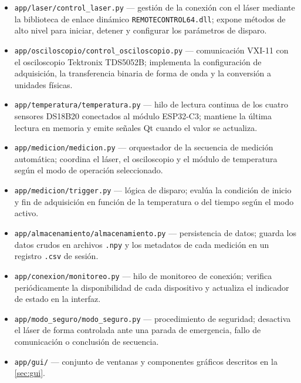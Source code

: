 \begin{itemize}
    \item \texttt{app/laser/control\_laser.py} — gestión de la conexión
    con el láser mediante la biblioteca de enlace dinámico
    \texttt{REMOTECONTROL64.dll}; expone métodos de alto nivel para
    iniciar, detener y configurar los parámetros de disparo.

    \item \texttt{app/osciloscopio/control\_osciloscopio.py} — comunicación
    VXI-11 con el osciloscopio Tektronix TDS5052B; implementa la
    configuración de adquisición, la transferencia binaria de forma de
    onda y la conversión a unidades físicas.

    \item \texttt{app/temperatura/temperatura.py} — hilo de lectura
    continua de los cuatro sensores DS18B20 conectados al módulo ESP32-C3;
    mantiene la última lectura en memoria y emite señales Qt cuando
    el valor se actualiza.

    \item \texttt{app/medicion/medicion.py} — orquestador de la secuencia
    de medición automática; coordina el láser, el osciloscopio y el
    módulo de temperatura según el modo de operación seleccionado.

    \item \texttt{app/medicion/trigger.py} — lógica de disparo; evalúa
    la condición de inicio y fin de adquisición en función de la
    temperatura o del tiempo según el modo activo.

    \item \texttt{app/almacenamiento/almacenamiento.py} — persistencia
    de datos; guarda los datos crudos en archivos \texttt{.npy} y
    los metadatos de cada medición en un registro \texttt{.csv} de sesión.

    \item \texttt{app/conexion/monitoreo.py} — hilo de monitoreo de
    conexión; verifica periódicamente la disponibilidad de cada
    dispositivo y actualiza el indicador de estado en la interfaz.

    \item \texttt{app/modo\_seguro/modo\_seguro.py} — procedimiento de
    seguridad; desactiva el láser de forma controlada ante una parada
    de emergencia, fallo de comunicación o conclusión de secuencia.

    \item \texttt{app/gui/} — conjunto de ventanas y componentes gráficos
    descritos en la \cref{sec:gui}.
\end{itemize}

